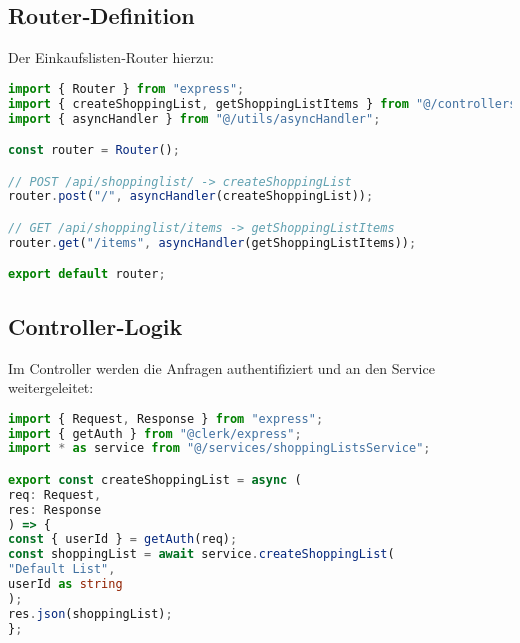 \subsection{Router‑Definition}
Der Einkaufslisten‑Router hierzu:

\begin{lstlisting}[language=TypeScript,caption={Routing des Einkaufslisten‑Endpoints im Backend (\texttt{shoppingLists.ts})}]
import { Router } from "express";
import { createShoppingList, getShoppingListItems } from "@/controllers/shoppingListsController";
import { asyncHandler } from "@/utils/asyncHandler";

const router = Router();

// POST /api/shoppinglist/ -> createShoppingList
router.post("/", asyncHandler(createShoppingList));

// GET /api/shoppinglist/items -> getShoppingListItems
router.get("/items", asyncHandler(getShoppingListItems));

export default router;
\end{lstlisting}

\subsection{Controller‑Logik}
Im Controller werden die Anfragen authentifiziert und an den Service weitergeleitet:

\begin{lstlisting}[language=TypeScript,caption={Erstellen eines Einkaufslisten‑Eintrags im Backend (\texttt{shoppingListsController.ts})}]
import { Request, Response } from "express";
import { getAuth } from "@clerk/express";
import * as service from "@/services/shoppingListsService";

export const createShoppingList = async (
req: Request,
res: Response
) => {
const { userId } = getAuth(req);
const shoppingList = await service.createShoppingList(
"Default List",
userId as string
);
res.json(shoppingList);
};
\end{lstlisting}

